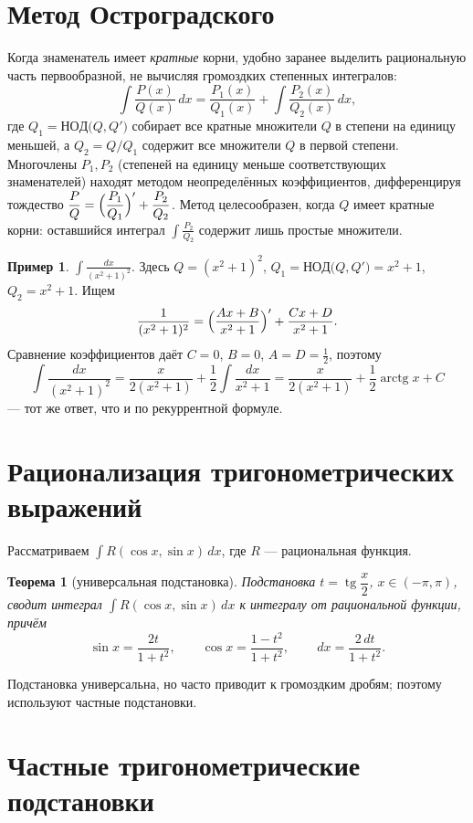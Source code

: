 \documentclass[11pt,a4paper]{article}
\theoremstyle{definition}
\newtheorem{example}[definition]{Пример}
\theoremstyle{plain}
\newtheorem{theorem}[definition]{Теорема}
\DeclareMathOperator{\tg}{tg}
\DeclareMathOperator{\arctg}{arctg}
\newcommand{\dx}{\,dx}
\begin{document}
\section{Метод Остроградского}

Когда знаменатель имеет \emph{кратные} корни, удобно заранее выделить рациональную часть
первообразной, не вычисляя громоздких степенных интегралов:
\[
  \int\frac{P(x)}{Q(x)}\dx=\frac{P_1(x)}{Q_1(x)}+\int\frac{P_2(x)}{Q_2(x)}\dx,
\]
где $Q_1=\mathrm{НОД}\bigl(Q,Q'\bigr)$ собирает все кратные множители $Q$ в степени на единицу
меньшей, а $Q_2=Q/Q_1$ содержит все множители $Q$ в первой степени. Многочлены $P_1,P_2$ (степеней
на единицу меньше соответствующих знаменателей) находят методом неопределённых коэффициентов,
дифференцируя тождество
$\dfrac{P}{Q}=\Bigl(\dfrac{P_1}{Q_1}\Bigr)'+\dfrac{P_2}{Q_2}$. Метод целесообразен, когда $Q$
имеет кратные корни: оставшийся интеграл $\int\frac{P_2}{Q_2}$ содержит лишь простые множители.

\begin{example}
$\displaystyle\int\frac{dx}{(x^2+1)^2}$. Здесь $Q=(x^2+1)^2$, $Q_1=\mathrm{НОД}\bigl(Q,Q'\bigr)=x^2+1$,
$Q_2=x^2+1$. Ищем
\[
  \frac{1}{(x^2+1)^2}=\Bigl(\frac{Ax+B}{x^2+1}\Bigr)'+\frac{Cx+D}{x^2+1}.
\]
Сравнение коэффициентов даёт $C=0$, $B=0$, $A=D=\tfrac12$, поэтому
\[
  \int\frac{dx}{(x^2+1)^2}=\frac{x}{2(x^2+1)}+\frac12\int\frac{dx}{x^2+1}
   =\frac{x}{2(x^2+1)}+\frac12\arctg x+C
\]
— тот же ответ, что и по рекуррентной формуле.
\end{example}

\section{Рационализация тригонометрических выражений}

Рассматриваем $\displaystyle\int R(\cos x,\sin x)\dx$, где $R$ — рациональная функция.

\begin{theorem}[универсальная подстановка]
Подстановка $t=\tg\dfrac x2$, $x\in(-\pi,\pi)$, сводит интеграл $\int R(\cos x,\sin x)\dx$ к
интегралу от рациональной функции, причём
\[
  \sin x=\frac{2t}{1+t^2},\qquad \cos x=\frac{1-t^2}{1+t^2},\qquad \dx=\frac{2\,dt}{1+t^2}.
\]
\end{theorem}

Подстановка универсальна, но часто приводит к громоздким дробям; поэтому используют частные
подстановки.

\section{Частные тригонометрические подстановки}
\end{document}
